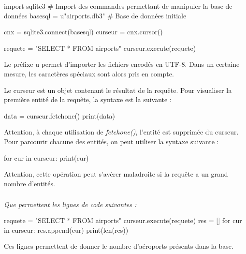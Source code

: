 \documentclass[10pt,fleqn]{article} %
\begin{document}
\begin{py}
\begin{python}
import sqlite3 # Import des commandes permettant de manipuler la base de données
basesql = u"airports.db3" # Base de données initiale

cnx = sqlite3.connect(basesql)
curseur = cnx.cursor()

requete = "SELECT * FROM airports"
curseur.execute(requete)
\end{python}

Le préfixe u permet d'importer les fichiers encodés en UTF-8. Dans un certaine mesure, les caractères spéciaux sont alors pris en compte.\end{py}


\begin{py}
Le curseur est un objet contenant le résultat de la requête. Pour visualiser la première entité de la requête, la syntaxe est la suivante : 
\begin{python}
data = curseur.fetchone()
print(data)
\end{python}

Attention, à chaque utilisation de \textsl{fetchone()}, l'entité est supprimée du curseur. Pour parcourir chacune des entités, on peut utiliser la syntaxe suivante : 
\begin{python}
for cur in curseur:
    print(cur)
\end{python}

Attention, cette opération peut s'avérer maladroite si la requête a un grand nombre d'entités. 
\end{py}

\fi
%
%
%

\subparagraph{}
\textit{Que permettent les lignes de code suivantes :}

\begin{py}
\begin{python}
requete = "SELECT * FROM airports"
curseur.execute(requete)
res = []
for cur in curseur:
    res.append(cur)
print(len(res))
\end{python}
\end{py}
\ifprof
\begin{corrige}
Ces lignes permettent de donner le nombre d'aéroports présents dans la base. 
\end{corrige}
\else
\fi
\end{document}
